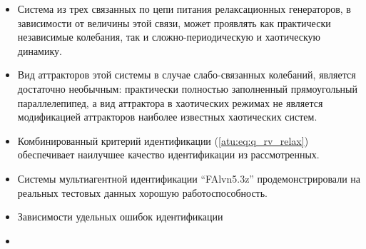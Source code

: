 \begin{itemize}

  \item
    Система из трех связанных по цепи питания релаксационных генераторов,
    в зависимости от величины этой связи, может
    проявлять как практически независимые колебания,
    так и сложно-периодическую и хаотическую динамику.


  \item
    Вид аттракторов этой системы в случае слабо-связанных колебаний,
    является достаточно необычным: практически полностью заполненный
    прямоугольный параллелепипед,
    а вид аттрактора в хаотических режимах не является
    модификацией аттракторов наиболее известных хаотических систем.


  \item
    Комбинированный критерий идентификации (\ref{atu:eq:q_rv_relax})
    обеспечивает наилучшее качество идентификации из рассмотренных.

  \item
    Системы мультиагентной идентификации ``FAlvn5.3z''
    продемонстрировали на реальных тестовых данных
    хорошую работоспособность.

  \item
    Зависимости удельных ошибок идентификации 

  \item

\end{itemize}




